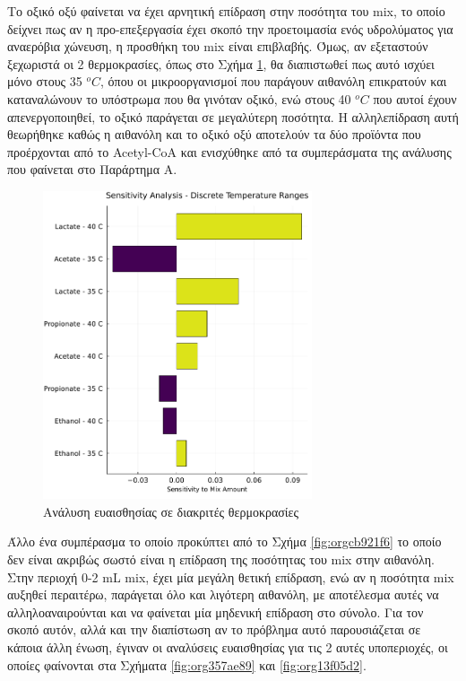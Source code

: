 \documentclass[11pt]{report}
\begin{document}
Το οξικό οξύ φαίνεται να έχει αρνητική επίδραση στην ποσότητα του \acrshort{mix}, το οποίο δείχνει πως αν η προ-επεξεργασία έχει σκοπό την προετοιμασία ενός υδρολύματος για αναερόβια χώνευση, η προσθήκη του \acrshort{mix} είναι επιβλαβής. Όμως, αν εξεταστούν ξεχωριστά οι 2 θερμοκρασίες, όπως στο Σχήμα \ref{fig:org513f28b}, θα διαπιστωθεί πως αυτό ισχύει μόνο στους 35 \(^oC\), όπου οι μικροοργανισμοί που παράγουν αιθανόλη επικρατούν και καταναλώνουν το υπόστρωμα που θα γινόταν οξικό, ενώ στους 40 \(^oC\) που αυτοί έχουν απενεργοποιηθεί, το οξικό παράγεται σε μεγαλύτερη ποσότητα. Η αλληλεπίδραση αυτή θεωρήθηκε καθώς η αιθανόλη και το οξικό οξύ αποτελούν τα δύο προϊόντα που προέρχονται από το Acetyl-CoA και ενισχύθηκε από τα συμπεράσματα της ανάλυσης που φαίνεται στο Παράρτημα A. 

\begin{figure}[htbp]
\centering
\includegraphics[width=300px]{../plots/sensitivity/temperature_tornado.png}
\caption{\label{fig:org513f28b}Ανάλυση ευαισθησίας σε διακριτές θερμοκρασίες}
\end{figure}

Άλλο ένα συμπέρασμα το οποίο προκύπτει από το Σχήμα \ref{fig:orgcb921f6} το οποίο δεν είναι ακριβώς σωστό είναι η επίδραση της ποσότητας του \acrshort{mix} στην αιθανόλη. Στην περιοχή 0-2 mL \acrshort{mix}, έχει μία μεγάλη θετική επίδραση, ενώ αν η ποσότητα \acrshort{mix} αυξηθεί περαιτέρω, παράγεται όλο και λιγότερη αιθανόλη, με αποτέλεσμα αυτές να αλληλοαναιρούνται και να φαίνεται μία μηδενική επίδραση στο σύνολο. Για τον σκοπό αυτόν, αλλά και την διαπίστωση αν το πρόβλημα αυτό παρουσιάζεται σε κάποια άλλη ένωση, έγιναν οι αναλύσεις ευαισθησίας για τις 2 αυτές υποπεριοχές, οι οποίες φαίνονται στα Σχήματα \ref{fig:org357ae89} και \ref{fig:org13f05d2}.
\end{document}
